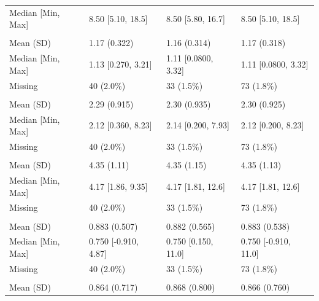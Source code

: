 \documentclass[
]{article}
\begin{document}
\begin{longtable}[t]{llll}
\hspace{1em}Median [Min, Max] & 8.50 [5.10, 18.5] & 8.50 [5.80, 16.7] & 8.50 [5.10, 18.5]\\
\addlinespace[0.3em]
\multicolumn{4}{l}{\textbf{HDL1BL}}\\
\hspace{1em}Mean (SD) & 1.17 (0.322) & 1.16 (0.314) & 1.17 (0.318)\\
\hspace{1em}Median [Min, Max] & 1.13 [0.270, 3.21] & 1.11 [0.0800, 3.32] & 1.11 [0.0800, 3.32]\\
\hspace{1em}Missing & 40 (2.0\%) & 33 (1.5\%) & 73 \vphantom{5} (1.8\%)\\
\addlinespace[0.3em]
\multicolumn{4}{l}{\textbf{LDL1BL}}\\
\hspace{1em}Mean (SD) & 2.29 (0.915) & 2.30 (0.935) & 2.30 (0.925)\\
\hspace{1em}Median [Min, Max] & 2.12 [0.360, 8.23] & 2.14 [0.200, 7.93] & 2.12 [0.200, 8.23]\\
\hspace{1em}Missing & 40 (2.0\%) & 33 (1.5\%) & 73 \vphantom{4} (1.8\%)\\
\addlinespace[0.3em]
\multicolumn{4}{l}{\textbf{CHOL1BL}}\\
\hspace{1em}Mean (SD) & 4.35 (1.11) & 4.35 (1.15) & 4.35 (1.13)\\
\hspace{1em}Median [Min, Max] & 4.17 [1.86, 9.35] & 4.17 [1.81, 12.6] & 4.17 [1.81, 12.6]\\
\hspace{1em}Missing & 40 (2.0\%) & 33 (1.5\%) & 73 \vphantom{3} (1.8\%)\\
\addlinespace[0.3em]
\multicolumn{4}{l}{\textbf{RC}}\\
\hspace{1em}Mean (SD) & 0.883 (0.507) & 0.882 (0.565) & 0.883 (0.538)\\
\hspace{1em}Median [Min, Max] & 0.750 [-0.910, 4.87] & 0.750 [0.150, 11.0] & 0.750 [-0.910, 11.0]\\
\hspace{1em}Missing & 40 (2.0\%) & 33 (1.5\%) & 73 \vphantom{2} (1.8\%)\\
\addlinespace[0.3em]
\multicolumn{4}{l}{\textbf{RCoverHDL}}\\
\hspace{1em}Mean (SD) & 0.864 (0.717) & 0.868 (0.800) & 0.866 (0.760)\\

\end{longtable}
\end{document}
